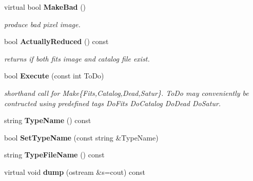 \begin{CompactItemize}
\item 
{}
virtual bool {\bf Make\-Bad} ()\label{class_reducedimage_a30}

\begin{CompactList}\small\item\em produce bad pixel image.\item\end{CompactList}\item 
{}
bool {\bf Actually\-Reduced} () const\label{class_reducedimage_a31}

\begin{CompactList}\small\item\em returns if both fits image and catalog file exist.\item\end{CompactList}\item 
{}
bool {\bf Execute} (const int To\-Do)\label{class_reducedimage_a32}

\begin{CompactList}\small\item\em shorthand call for Make\{Fits,Catalog,Dead,Satur\}. To\-Do may conveniently be contructed using predefined tags Do\-Fits Do\-Catalog Do\-Dead Do\-Satur.\item\end{CompactList}\item 
{}
string {\bf Type\-Name} () const\label{class_reducedimage_a33}

\item 
{}
bool {\bf Set\-Type\-Name} (const string \&Type\-Name)\label{class_reducedimage_a34}

\item 
{}
string {\bf Type\-File\-Name} () const\label{class_reducedimage_a35}

\item 
{}
virtual void {\bf dump} (ostream \&s=cout) const\label{class_reducedimage_a36}


\end{CompactItemize}
